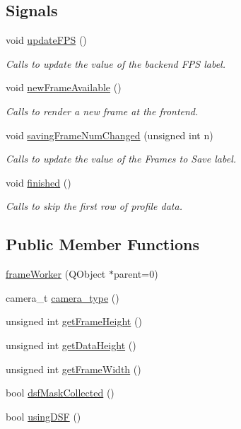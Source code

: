 \subsection*{Signals}
\begin{DoxyCompactItemize}
\item 
\hypertarget{classframeWorker_af999825f30430a102aa1c50d739e7f59}{void \hyperlink{classframeWorker_af999825f30430a102aa1c50d739e7f59}{update\+F\+P\+S} ()}\label{classframeWorker_af999825f30430a102aa1c50d739e7f59}

\begin{DoxyCompactList}\small\item\em Calls to update the value of the backend F\+P\+S label. \end{DoxyCompactList}\item 
void \hyperlink{classframeWorker_aadb9de42063c57313039892dcf07bbb0}{new\+Frame\+Available} ()
\begin{DoxyCompactList}\small\item\em Calls to render a new frame at the frontend. \end{DoxyCompactList}\item 
void \hyperlink{classframeWorker_a91f559364b595696d947ecb5934676a1}{saving\+Frame\+Num\+Changed} (unsigned int n)
\begin{DoxyCompactList}\small\item\em Calls to update the value of the Frames to Save label. \end{DoxyCompactList}\item 
void \hyperlink{classframeWorker_a056281a50b738f9ae8ca27db60cdc5e7}{finished} ()
\begin{DoxyCompactList}\small\item\em Calls to skip the first row of profile data. \end{DoxyCompactList}\end{DoxyCompactItemize}
\subsection*{Public Member Functions}
\begin{DoxyCompactItemize}
\item 
\hyperlink{classframeWorker_ad49e6fa82d24435f7276915760166c5e}{frame\+Worker} (Q\+Object $\ast$parent=0)
\item 
camera\+\_\+t \hyperlink{classframeWorker_a0f693e8095e3762ec668333cd21196b9}{camera\+\_\+type} ()
\item 
unsigned int \hyperlink{classframeWorker_ad58cd846bf92a4a7314ed2623ffc2795}{get\+Frame\+Height} ()
\item 
unsigned int \hyperlink{classframeWorker_ae24f12f19234487e1c0ab0df1c3b39f0}{get\+Data\+Height} ()
\item 
unsigned int \hyperlink{classframeWorker_abf23aee1d3247658063f18fb8a72f4be}{get\+Frame\+Width} ()
\item 
bool \hyperlink{classframeWorker_a1291aade7043f70655e0b364e3c7c948}{dsf\+Mask\+Collected} ()
\item 
bool \hyperlink{classframeWorker_a9ca4f22277326f54df18f815356b0456}{using\+D\+S\+F} ()
\end{DoxyCompactItemize}
